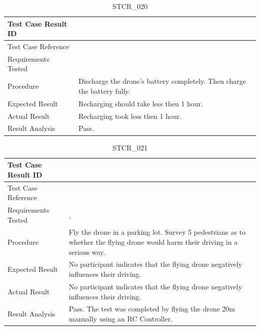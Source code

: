 \documentclass[12pt, titlepage]{article}
\begin{document}
\begin{table}[!h]
\begin{center}
\caption {STCR\_020}
\label{tab:STCR_020}
\begin{tabular}{ | m{3.2cm} | m{12.2cm} | } 
\hline
Test Case Result ID & \nameref{tab:STCR_020} \\ 
\hline
Test Case Reference & \nameref{tab:STC_020}  \\ 
\hline
Requirements Tested & \nameref{MTNC_001} \\
\hline
Procedure & Discharge the drone's battery completely. Then charge the battery fully. \\
\hline
Expected Result & Recharging should take less then 1 hour.  \\ 
\hline
Actual Result &  Recharging took less then 1 hour.  \\
\hline
Result Analysis & Pass.  \\ 
\hline
\end{tabular}
\end{center}
\end{table}

\begin{table}[!h]
\begin{center}
\caption {STCR\_021}
\label{tab:STCR_021}
\begin{tabular}{ | m{3.2cm} | m{12.2cm} | } 
\hline
Test Case Result ID & \nameref{tab:STCR_021} \\ 
\hline
Test Case Reference & \nameref{tab:STC_021}  \\ 
\hline
Requirements Tested & \nameref{SAFE_004}, \nameref{SAFE_001}
 \\ 
\hline
Procedure & Fly the drone in a parking lot. Survey 5 pedestrians as to whether the flying drone would harm their driving in a serious way. \\
\hline
Expected Result & No participant indicates that the flying drone negatively influences their driving.  \\ 
\hline
Actual Result &  No participant indicates that the flying drone negatively influences their driving.  \\
\hline
Result Analysis & Pass. The test was completed by flying the drone 20m manually using an RC Controller. \\ 
\hline
\end{tabular}
\end{center}
\end{table}
\end{document}
